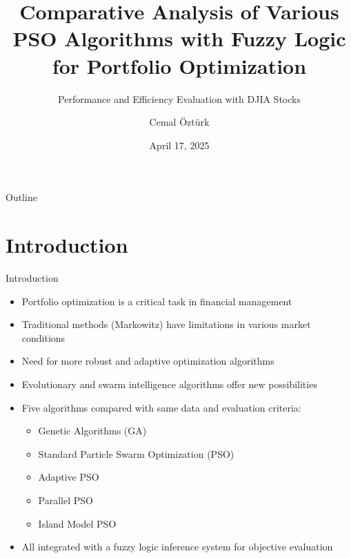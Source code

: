\documentclass[aspectratio=169,xcolor=table]{beamer}
\title{Comparative Analysis of Various PSO Algorithms with Fuzzy Logic for Portfolio Optimization}
\subtitle{Performance and Efficiency Evaluation with DJIA Stocks}
\author{Cemal Öztürk}
\institute{Pamukkale University\\ Department of Computer Engineering}
\date{April 17, 2025}
\begin{document}
\begin{frame}
  \titlepage
\end{frame}

\begin{frame}{Outline}
  \tableofcontents
\end{frame}

\section{Introduction}

\begin{frame}{Introduction}
  \begin{tcolorbox}[
    enhanced,
    colback=blue!5,
    colframe=blue!70,
    arc=2mm,
    title=Portfolio Optimization Challenges,
    fonttitle=\bfseries\large,
    boxrule=0.5mm
  ]
    \begin{itemize}
      \item Portfolio optimization is a critical task in financial management
      \item Traditional methods (Markowitz) have limitations in various market conditions
      \item Need for more robust and adaptive optimization algorithms
    \end{itemize}
  \end{tcolorbox}
  
  \vspace{0.3cm}
  
  \begin{tcolorbox}[
    enhanced,
    colback=blue!5,
    colframe=blue!70,
    arc=2mm,
    title=Our Approach,
    fonttitle=\bfseries\large,
    boxrule=0.5mm
  ]
    \begin{itemize}
      \item Evolutionary and swarm intelligence algorithms offer new possibilities
      \item Five algorithms compared with same data and evaluation criteria:
        \begin{itemize}
          \item Genetic Algorithms (GA)
          \item Standard Particle Swarm Optimization (PSO)
          \item Adaptive PSO
          \item Parallel PSO
          \item Island Model PSO
        \end{itemize}
      \item All integrated with a fuzzy logic inference system for objective evaluation
    \end{itemize}
  \end{tcolorbox}
\end{frame}
\end{document}
